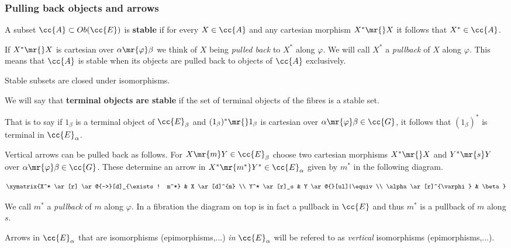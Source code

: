 \subsubsection{Pulling back objects and arrows}

 
\begin{definition}
 A subset $\cc{A} \subset Ob(\cc{E})$ is \textbf{stable} if for every $X \in \cc{A}$ and any cartesian morphism $X^* \mr{} X$ it follows that $X^* \in \cc{A}$.
\end{definition}

If $X^* \mr{} X$ is cartesian over $\alpha \mr{\varphi} \beta$ we think of $X$  being \textit{pulled back} to $X^*$ along $\varphi$. We will call $X^*$ a \textit{pullback} of $X$ along $\varphi$. This means that $\cc{A}$ is stable when its objects are pulled back to objects of $\cc{A}$ exclusively.  

\begin{remark}
Stable subsets are closed under isomorphisms.
\end{remark}

\begin{definition}
We will say that \textbf{terminal objects are stable}  if the set of terminal objects of the fibres is a stable set.
\end{definition}

\noindent That is to say  if $1_\beta$ is a terminal object of $\cc{E}_\beta$ and ${(1_\beta)^* \mr{} 1_\beta }$ is cartesian over $\alpha \mr{\varphi} \beta \in \cc{G}$, it follows that $(1_\beta)^*$ is terminal in $\cc{E}_\alpha$.

\begin{observation}
Vertical arrows can  be  pulled back  as follows. For ${X \mr{m} Y \in \cc{E}_\beta}$ choose two cartesian morphisms ${X^* \mr{} X}$ and ${Y^* \mr{s} Y}$ over $\alpha \mr{\varphi} \beta \in \cc{G}$. These determine an arrow in ${X^* \mr{m^*} Y^* \in\cc{E}_\alpha}$ given by $m^*$ in the following diagram.


\[
\xymatrix{X^* \ar[r] \ar@{-->}[d]_{\exists ! m^*} & X \ar[d]^{m} \\
		  Y^* \ar[r]_s  & Y \ar@{}[ul]|\equiv  \\
		  \alpha \ar[r]^{\varphi} & \beta}
\]

\noindent We call $m^*$ a \textit{pullback} of $m$ along $\varphi$. In a fibration the diagram on top is in fact a pullback in $\cc{E}$ and thus $m^*$ is a pullback of $m$ along $s$.  

Arrows in $\cc{E}_\alpha$ that are isomorphisms (epimorphisms,...) \textit{in} $\cc{E}_\alpha$  will be refered to as \textit{vertical} isomorphisms (epimorphisms,...).
\end{observation}


